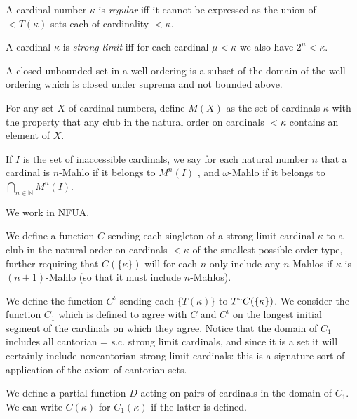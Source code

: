 \documentclass[12pt]{article}
\begin{document}
A cardinal number $\kappa$ is {\em regular\/} iff it cannot be expressed as the union of $<T(\kappa)$ sets each of cardinality $<\kappa$.

A cardinal $\kappa$ is {\em strong limit\/} iff for each cardinal $\mu<\kappa$ we also have $2^{\mu} < \kappa$.

A closed unbounded set in a well-ordering is a subset of the domain of the well-ordering which is closed under suprema and not bounded above.

For any set $X$ of cardinal numbers, define $M(X)$ as the set of cardinals $\kappa$ with the property that any club in the natural order on cardinals $<\kappa$ contains an element of $X$.

If $I$ is the set of inaccessible cardinals, we say for each natural number $n$ that a cardinal is $n$-Mahlo if it belongs to $M^n(I)$ , and $\omega$-Mahlo if it belongs to $\bigcap_{n \in {\mathbb N}} M^n(I)$.

We work in NFUA.

We define a function $C$ sending each singleton of a strong limit cardinal $\kappa$ to a club in the natural order on cardinals $<\kappa$ of the smallest possible order type, further requiring that $C(\{\kappa\})$ will for each $n$ only include any $n$-Mahlos
if $\kappa$ is $(n+1)$-Mahlo (so that it must include $n$-Mahlos).

We define the function $C^{\iota}$ sending each $\{T(\kappa)\}$ to $T``C(\{\kappa\})$.  We consider the function $C_1$ which is defined to agree with $C$ and $C^{\iota}$ on the longest initial segment of the cardinals on which they agree.
Notice that the domain of $C_1$ includes all cantorian = s.c. strong limit cardinals, and since it is a set it will certainly include noncantorian strong limit cardinals:  this is a signature sort of application of the axiom of cantorian sets.

We define a partial function $D$ acting on pairs of cardinals in the domain of $C_1$.  We can write $C(\kappa)$ for $C_1(\kappa)$ if the latter is defined.
\end{document}
